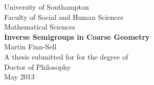 \begin{titlepage}
\begin{center}

\huge University of Southampton \\[1cm]

\large Faculty of Social and Human Sciences \\[0.5cm]
\LARGE Mathematical Sciences \\[2cm]
\huge \textbf{Inverse Semigroups in Coarse Geometry} \\[2.5cm]

\Large Martin Finn-Sell\\[2cm]

\large A thesis submitted for for the degree of\\
Doctor of Philosophy\\[8cm]

\large May 2013

\end{center}
\end{titlepage}